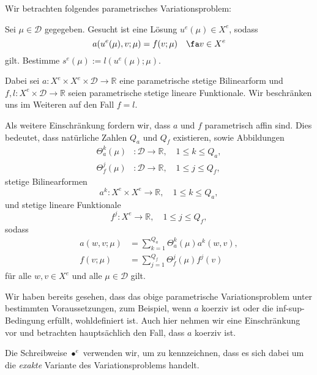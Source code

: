 Wir betrachten folgendes parametrisches Variationsproblem:
\begin{addmargin}[2em]{2em}
    Sei $\mu \in \mathcal D$ gegegeben. Gesucht ist eine Lösung $u^e(\mu) \in X^e$, sodass
    \begin{equation}
        a(u^e(\mu), v; \mu) = f(v; \mu) \quad \fa v \in X^e
    \end{equation}
    gilt.
    Bestimme $s^e(\mu) := l(u^e(\mu); \mu)$.
\end{addmargin}
Dabei sei $a \colon X^e \times X^e \times \mathcal D \to \mathbb{R}$ eine parametrische stetige Bilinearform und $f, l \colon X^e \times \mathcal D \to \mathbb{R}$ seien parametrische stetige lineare Funktionale.
Wir beschränken uns im Weiteren auf den Fall $f = l$.

Als weitere Einschränkung fordern wir, dass $a$ und $f$ parametrisch affin sind.
Dies bedeutet, dass natürliche Zahlen $Q_a$ und $Q_f$ existieren, sowie Abbildungen
\begin{align}
    \Theta_a^k(\mu) &\colon \mathcal D \to \mathbb{R}, \quad 1 \leq k \leq Q_a, \\
    \Theta_f^j(\mu) &\colon \mathcal D \to \mathbb{R}, \quad 1 \leq j \leq Q_f,
\end{align}
stetige Bilinearformen
\begin{equation}
    a^k \colon X^e \times X^e \to \mathbb{R}, \quad 1 \leq k \leq Q_a,
\end{equation}
und stetige lineare Funktionale
\begin{equation}
    f^j \colon X^e \to \mathbb{R}, \quad 1 \leq j \leq Q_f,
\end{equation}
sodass
\begin{align*}
    a(w, v; \mu) &= \sum_{k=1}^{Q_a} \Theta_a^k(\mu) a^k(w, v), \\
    f(v; \mu)    &= \sum_{j=1}^{Q_f} \Theta_f^j(\mu) f^j(v)
\end{align*}
für alle $w, v \in X^e$ und alle $\mu \in \mathcal D$ gilt.


Wir haben bereits gesehen, dass das obige parametrische Variationsproblem unter bestimmten Voraussetzungen, zum Beispiel, wenn $a$ koerziv ist oder die inf-sup-Bedingung erfüllt, wohldefiniert ist.
Auch hier nehmen wir eine Einschränkung vor und betrachten hauptsächlich den Fall, dass $a$ koerziv ist.

Die Schreibweise $\bullet^e$ verwenden wir, um zu kennzeichnen, dass es sich dabei um die \emph{exakte} Variante des Variationsproblems handelt.

